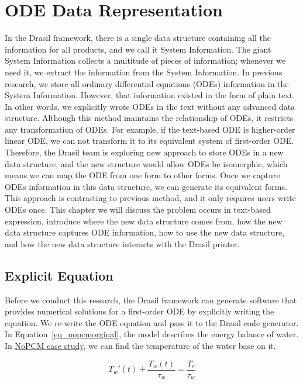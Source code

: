 \chapter{ODE Data Representation}
In the Drasil framework, there is a single data structure containing all the information for all products, and we call it System Information. The giant System Information collects a multitude of pieces of information; whenever we need it, we extract the information from the System Information. In previous research, we store all ordinary differential equations (ODEs) information in the System Information. However, that information existed in the form of plain text. In other words, we explicitly wrote ODEs in the text without any advanced data structure. Although this method maintains the relationship of ODEs, it restricts any transformation of ODEs. For example, if the text-based ODE is higher-order linear ODE, we can not transform it to its equivalent system of first-order ODE. Therefore, the Drasil team is exploring new approach to store ODEs in a new data structure, and the new structure would allow ODEs be isomorphic, which means we can map the ODE from one form to other forms. Once we capture ODEs information in this data structure, we can generate its equivalent forms. This approach is contrasting to previous method, and it only requires users write ODEs once. This chapter we will discuss the problem occurs in text-based expression, introduce where the new data structure comes from, how the new data structure captures ODE information, how to use the new data structure, and how the new data structure interacts with the Drasil printer.

\section{Explicit Equation}
Before we conduct this research, the Drasil framework can generate software that provides numerical solutions for a first-order ODE by explicitly writing the equation. We re-write the ODE equation and pass it to the Drasil code generator. In Equation~\ref{eq_nopcmorginal}, the model describes the energy balance of water. In \href{https://jacquescarette.github.io/Drasil/examples/nopcm/SRS/srs/NoPCM_SRS.html#Sec:IMs}{NoPCM case study}, we can find the temperature of the water base on it.

\begin{equation} \label{eq_nopcmorginal}
	T_{w}'(t) +  \frac {T_{w}(t)}{\tau_{w}} = \frac{T_{c}}{\tau_{w}}
\end{equation}

